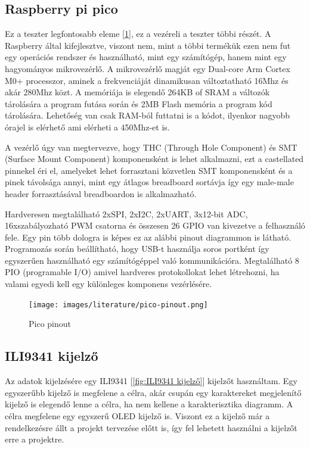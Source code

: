 \subsection{Raspberry pi pico}

Ez a teszter legfontosabb eleme [\ref{fig:Pico_pinout}], ez a vezéreli a teszter többi részét. A Raspberry 
által kifejlesztve, viszont nem, mint a többi termékük ezen nem fut egy operációs 
rendszer és használható, mint egy számítógép, hanem mint egy hagyományos 
mikrovezérlő. A mikrovezérlő magját egy Dual-core Arm Cortex M0+ processzor, 
aminek a frekvenciáját dinamikusan változtatható 16Mhz és akár 280Mhz közt. A 
memóriája is elegendő 264KB of SRAM a változók tárolására a program futása során 
és 2MB Flash memória a program kód tárolására. Lehetőség van csak RAM-ból futtatni 
is a kódot, ilyenkor nagyobb órajel is elérhető ami elérheti a 450Mhz-et is.

A vezérlő úgy van megtervezve, hogy THC (Through Hole Component) és SMT 
(Surface Mount Component) komponensként is lehet alkalmazni, 
ezt a castellated pinnekel éri el, amelyeket lehet forrasztani közvetlen SMT 
komponensként és a pinek távolsága annyi, mint egy átlagos breadboard sortávja így 
egy male-male header forrasztásával breadboardon is alkalmazható. 

Hardveresen 
megtalálható 2xSPI, 2xI2C, 2xUART, 3x12-bit ADC, 16xszabályozható PWM csatorna és 
összesen 26 GPIO van kivezetve a felhasználó fele. Egy pin több dologra is képes 
ez az alábbi pinout diagrammon is látható. Programozás során beállítható, hogy 
USB-t használja soros portként így egyszerűen használható egy számítógéppel való 
kommunikációra. Megtalálható 8 PIO (programable I/O) amivel hardveres protokollokat 
lehet létrehozni, ha valami egyedi kell egy különleges komponens vezérlésére. 


\begin{figure}[H]
    \centering
    \texttt{[image: images/literature/pico-pinout.png]}
    \caption{Pico pinout}
    \label{fig:Pico_pinout}
\end{figure}


\subsection{ILI9341 kijelző}

Az adatok kijelzésére egy ILI9341 [\ref{fig:ILI9341 kijelző}] kijelzőt használtam.
Egy egyszerűbb kijelző is megfelene a célra, akár csupán egy karaktereket megjelenítő
kijelző is elegendő lenne a célra, ha nem kellene a karakterisztika diagramm. A 
célra megfelene egy egyszerű OLED kijelző is. Viszont ez a kijelző már a rendelkezésre
állt a projekt tervezése előtt is, így fel lehetett használni a kijelzőt erre a 
projektre.

